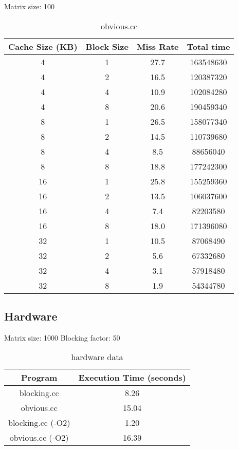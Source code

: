 \documentclass[letterpaper, 12pt, oneside]{memoir}
\begin{document}
Matrix size: 100
\begin{table}[H]
\centering
\begin{tabular}{c|c|c|c}
    Cache Size (KB)  & Block Size & Miss Rate & Total time \\ \hline 
    4  & 1 & 27.7   & 163548630 \\
    4  & 2 & 16.5   & 120387320 \\
    4  & 4 & 10.9   & 102084280 \\
    4  & 8 & 20.6   & 190459340 \\ \hline
    8  & 1 & 26.5   & 158077340 \\
    8  & 2 & 14.5   & 110739680 \\
    8  & 4 & 8.5    & 88656040 \\
    8  & 8 & 18.8   & 177242300 \\ \hline
    16 & 1 & 25.8   & 155259360 \\
    16 & 2 & 13.5   & 106037600 \\
    16 & 4 & 7.4    & 82203580 \\
    16 & 8 & 18.0   & 171396080 \\ \hline
    32 & 1 & 10.5   & 87068490 \\
    32 & 2 & 5.6    & 67332680 \\
    32 & 4 & 3.1    & 57918480 \\
    32 & 8 & 1.9    & 54344780 \\
\end{tabular}
\caption{obvious.cc}
\end{table}

\subsection{Hardware}

Matrix size: 1000
Blocking factor: 50
\begin{table}[H]
\centering
\begin{tabular}{c|c}
    Program & Execution Time (seconds) \\ \hline
    blocking.cc        & 8.26 \\
    obvious.cc         & 15.04 \\
    blocking.cc (-O2)  & 1.20 \\
    obvious.cc  (-O2)  & 16.39
\end{tabular}
\caption{hardware data}
\end{table}
\end{document}
